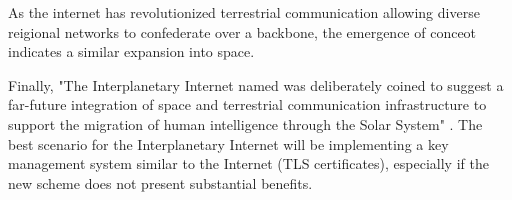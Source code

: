 As the internet has revolutionized terrestrial communication allowing diverse reigional networks to confederate over a backbone, the emergence of conceot indicates a similar expansion into space. 

Finally, "The Interplanetary Internet named was deliberately coined to suggest a far-future integration of space and terrestrial communication infrastructure to support the migration of human intelligence through the Solar System" \cite{burleigh2003interplanetary}. The best scenario for the Interplanetary Internet will be implementing a key management system similar to the Internet (TLS certificates), especially if the new scheme does not present substantial benefits. 

